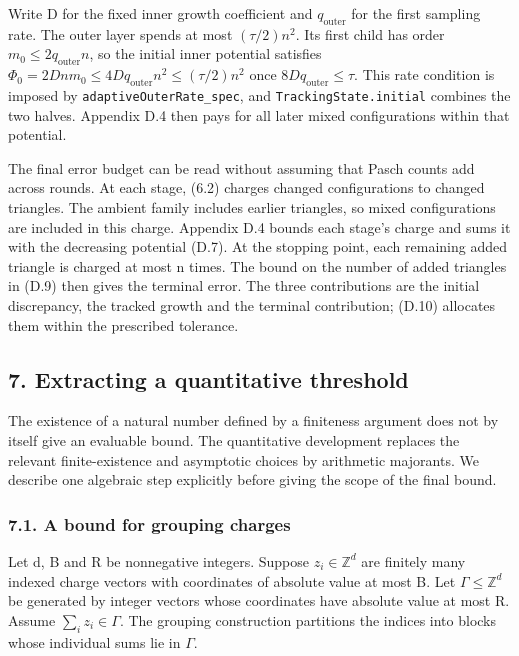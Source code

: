 \documentclass[english,11pt,a4paper]{article}
\begin{document}
Write D for the fixed inner growth coefficient and \(q_{\mathrm{outer}}\) for the first sampling rate. The outer layer spends at most \((\tau/2)n^2\). Its first child has order \(m_0\leq2q_{\mathrm{outer}}n\), so the initial inner potential satisfies \(\Phi_0=2Dnm_0\leq4Dq_{\mathrm{outer}}n^2\leq(\tau/2)n^2\) once \(8Dq_{\mathrm{outer}}\leq\tau\). This rate condition is imposed by \texttt{adaptive\allowbreak{}Outer\allowbreak{}Rate\_\allowbreak{}spec}, and \texttt{Tracking\allowbreak{}State.\allowbreak{}initial} combines the two halves. Appendix D.4 then pays for all later mixed configurations within that potential.

The final error budget can be read without assuming that Pasch counts add across rounds. At each stage, (6.2) charges changed configurations to changed triangles. The ambient family includes earlier triangles, so mixed configurations are included in this charge. Appendix D.4 bounds each stage's charge and sums it with the decreasing potential (D.7). At the stopping point, each remaining added triangle is charged at most n times. The bound on the number of added triangles in (D.9) then gives the terminal error. The three contributions are the initial discrepancy, the tracked growth and the terminal contribution; (D.10) allocates them within the prescribed tolerance.

\subsection{7. Extracting a quantitative threshold}\label{extracting-a-quantitative-threshold}

The existence of a natural number defined by a finiteness argument does not by itself give an evaluable bound. The quantitative development replaces the relevant finite-existence and asymptotic choices by arithmetic majorants. We describe one algebraic step explicitly before giving the scope of the final bound.

\subsubsection{7.1. A bound for grouping charges}\label{a-bound-for-grouping-charges}

Let d, B and R be nonnegative integers. Suppose \(z_i\in\mathbb Z^d\) are finitely many indexed charge vectors with coordinates of absolute value at most B. Let \(\Gamma\leq\mathbb Z^d\) be generated by integer vectors whose coordinates have absolute value at most R. Assume \(\sum_i z_i\in\Gamma\). The grouping construction partitions the indices into blocks whose individual sums lie in \(\Gamma\).
\end{document}
